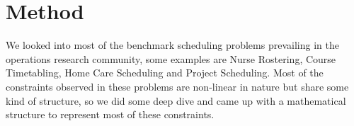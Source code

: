 \documentclass{article}
\newcommand{\TY}{\textbf{Y}\xspace}
\newcommand{\TZ}{\textbf{Z}\xspace}
\newcommand{\TE}{\textbf{E}\xspace}
\begin{document}


\section{Method}
\label{sec:method}

We looked into most of the benchmark scheduling problems prevailing in the operations research community, some examples are Nurse Rostering, Course Timetabling, Home Care Scheduling and Project Scheduling. Most of the constraints observed in these problems are non-linear in nature but share some kind of structure, so we did some deep dive and came up with a mathematical structure to represent most of these constraints. 
\end{document}
